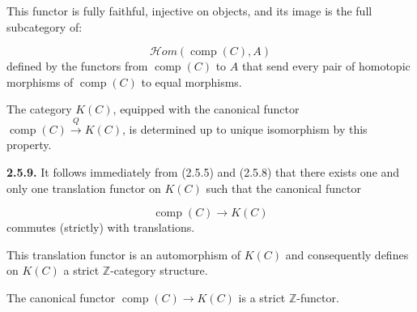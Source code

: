 This functor is fully faithful, injective on objects, and its image is the full
subcategory of:

\begin{equation*}
  \mathcal H\!om(\operatorname{comp}(C),A)
\end{equation*}
defined by the functors from $\operatorname{comp}(C)$ to $A$ that send every
pair of homotopic morphisms of $\operatorname{comp}(C)$ to equal morphisms.

The category $K(C)$, equipped with the canonical functor
$\operatorname{comp}(C)\xrightarrow{Q}K(C)$, is determined up to unique
isomorphism by this property.

\noindent\textbf{2.5.9.}\quad
It follows immediately from (2.5.5) and (2.5.8) that there exists one and only
one translation functor on $K(C)$ such that the canonical functor

\begin{equation*}
  \operatorname{comp}(C)\longrightarrow K(C)
\end{equation*}
commutes (strictly) with translations.

This translation functor is an automorphism of $K(C)$ and consequently
defines on $K(C)$ a strict $\mathbb Z$-category structure.

The canonical functor $\operatorname{comp}(C)\longrightarrow K(C)$ is a
strict $\mathbb Z$-functor.
